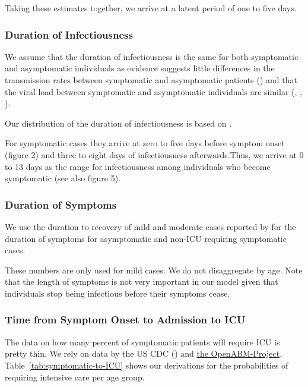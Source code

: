 
Taking these estimates together, we arrive at a latent period of one to five days.

\subsubsection{Duration of Infectiousness}

We assume that the duration of infectiousness is the same for both symptomatic and
asymptomatic individuals as evidence suggests little differences in the transmission
rates between symptomatic and asymptomatic patients
(\citet{Yin2020}) and that the viral load between symptomatic and asymptomatic
individuals are similar (\citet{Zou2020}, \citet{Byrne2020}, \citet{Singanayagam2020}).

Our distribution of the duration of infectiousness is based on \citet{Byrne2020}.

For symptomatic cases they arrive at zero to five days before symptom onset (figure 2)
and three to eight days of infectiousness afterwards.\footnotemark Thus, we arrive at 0
to 13 days as the range for infectiousness among individuals who become symptomatic (see
also figure 5).



\subsubsection{Duration of Symptoms}

We use the duration to recovery of mild and moderate cases reported by \cite[Figure~S3,
Panel~2]{Bi2020} for the duration of symptoms for asymptomatic and non-ICU requiring
symptomatic cases.

These numbers are only used for mild cases. We do not disaggregate by age. Note that the
length of symptoms is not very important in our model given that individuals stop being
infectious before their symptoms cease.


\subsubsection{Time from Symptom Onset to Admission to ICU}

The data on how many percent of symptomatic patients will require ICU is pretty thin. We
rely on data by the US CDC (\citet{Stokes2020}) and \href{https://bit.ly/3yKXFyu}{the
OpenABM-Project}. Table~\ref{tab:symptomatic-to-ICU} shows our derivations for the
probabilities of requiring intensive care per age group.


